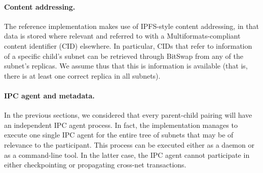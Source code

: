 \paragraph{Content addressing.} The reference implementation makes use of IPFS-style content addressing, in that data is stored where relevant and referred to with a Multiformats-compliant content identifier (CID) elsewhere. In particular, CIDs that refer to information of a specific child's subnet can be retrieved through BitSwap from any of the subnet's replicas. We assume thus that this is information is available (that is, there is at least one correct replica in all subnets). 

\paragraph{IPC agent and metadata.} In the previous sections, we considered that every parent-child pairing will have an independent IPC agent process. In fact, the implementation manages to execute one single IPC agent for the entire tree of subnets that may be of relevance to the participant. This process can be executed either as a daemon or as a command-line tool. In the latter case, the IPC agent cannot participate in either checkpointing or propagating cross-net transactions. 


